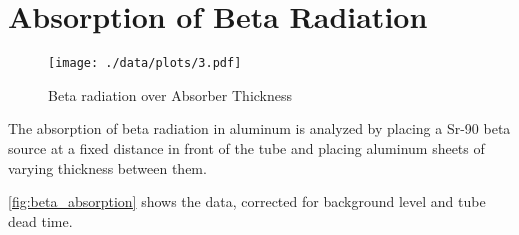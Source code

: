 \chapter{Absorption of Beta Radiation}

\begin{figure}[ht!]
	\centering
	\texttt{[image: ./data/plots/3.pdf]}
	\caption{Beta radiation over Absorber Thickness}
	\label{fig:beta_absorption}
\end{figure}

The absorption of beta radiation in aluminum is analyzed by placing a Sr-90 beta source at a fixed distance in front of the tube and placing aluminum sheets of varying thickness between them.

\autoref{fig:beta_absorption} shows the data, corrected for background level and tube dead time.
